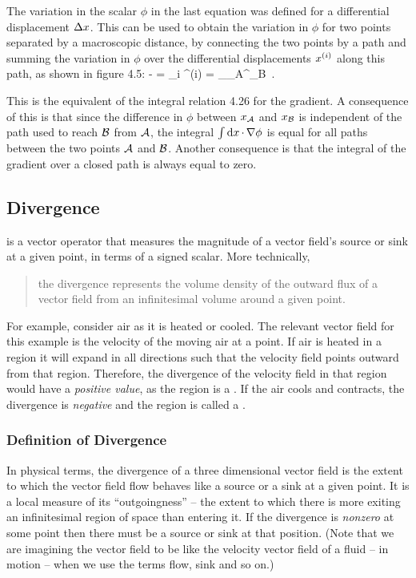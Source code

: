 The variation in the scalar $\phi$ in the last equation was defined for a differential displacement $\Delta x$. This can be used to obtain the variation in $\phi$ for two points separated by a macroscopic distance, by connecting the two points by a path and summing the variation in $\phi$ over the differential displacements $x^{(i)}$ along this path, as shown in figure 4.5:
\beq
\phi{} - \phi{}
    = \sum_i \diff\pvec^{(i)}\iprod\gder\phi
    = \int_{\pvec_{\point A}}^{\pvec_{\point B}} \dx\pvec\iprod\gder\phi\,.
\eeq

This is the equivalent of the integral relation 4.26 for the gradient. A consequence of this is that since the difference in $\phi$ between $x_{\mathcal{A}}$ and $x_{\mathcal{B}}$ is independent of the path used to reach $\mathcal{B}$ from $\mathcal{A}$, the integral $\int\text{d}x\operatorname{\cdot}\nabla\phi$ is equal for all paths between the two points $\mathcal{A}$ and $\mathcal{B}$. Another consequence is that the integral of the gradient over a closed path is always equal to zero.


\subsection{Divergence}
 is a vector operator that measures the magnitude of a vector field's source or sink at a given point, in terms of a signed scalar. More technically, 
\begin{quote}
the divergence represents the volume density of the outward flux of a vector field from an infinitesimal volume around a given point.
\end{quote}

For example, consider air as it is heated or cooled. The relevant vector field for this example is the velocity of the moving air at a point. If air is heated in a region it will expand in all directions such that the velocity field points outward from that region. Therefore, the divergence of the velocity field in that region would have a \emph{positive value}, as the region is a . If the air cools and contracts, the divergence is \emph{negative} and the region is called a .


\subsubsection{Definition of Divergence}
In physical terms, the divergence of a three dimensional vector field is the extent to which the vector field flow behaves like a source or a sink at a given point. It is a local measure of its ``outgoingness'' -- the extent to which there is more exiting an infinitesimal region of space than entering it. If the divergence is \emph{nonzero} at some point then there must be a source or sink at that position. (Note that we are imagining the vector field to be like the velocity vector field of a fluid -- in motion -- when we use the terms flow, sink and so on.)

